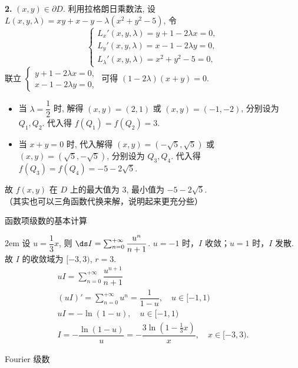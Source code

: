 \documentclass[UTF8,14pt,normal]{ctexart}
\begin{document}
    \textbf{2.} \((x, y) \in \partial D\). 利用拉格朗日乘数法, 设 \(L(x, y, \lambda) = xy + x - y - \lambda(x^2 + y^2 - 5)\), 令
    \[
        \begin{cases}
            L_x'(x, y, \lambda) = y + 1 - 2\lambda x = 0, \\
            L_y'(x, y, \lambda) = x - 1 - 2\lambda y = 0, \\
            L_\lambda'(x, y, \lambda) = x^2 + y^2 - 5 = 0,
        \end{cases}
    \]
    联立 \(\begin{cases}
        y + 1 - 2\lambda x = 0, \\
        x - 1 - 2\lambda y = 0,
        \end{cases}\) 可得 \((1 - 2\lambda)(x + y) = 0\).
    \begin{itemize}
        \item 当 \(\lambda = \dfrac{1}{2}\) 时, 解得 \((x, y) = (2, 1)\) 或 \((x, y) = (-1, -2)\), 分别设为 \(Q_1, Q_2\). 代入得 \(f(Q_1) = f(Q_2) = 3\).
        \item 当 \(x + y = 0\) 时, 代入解得 \((x, y) = (-\sqrt{5}, \sqrt{5})\) 或 \((x, y) = (\sqrt{5}, -\sqrt{5})\), 分别设为 \(Q_3, Q_4\). 代入得 \(f(Q_3) = f(Q_4) = -5 - 2\sqrt{5}\).
    \end{itemize}
    故 \(f(x, y)\) 在 \(D\) 上的最大值为 \(3\), 最小值为 \(-5 - 2\sqrt{5}\). \\
    （其实也可以三角函数代换来解，说明起来更充分些）

 函数项级数的基本计算

    \hangindent 2em
    \noindent
    设 \(u = \dfrac{1}{3} x\), 则 \(\ds I = \sum_{n = 0}^{+\infty} \dfrac{u^{n}}{n + 1}\). \(u = -1\) 时，\(I\) 收敛；\(u = 1\) 时，\(I\) 发散. 故 \(I\) 的收敛域为 \([-3, 3)\), \(r = 3\). \\
    \begin{gather*}
        uI = \sum_{n = 0}^{+\infty} \dfrac{u^{n + 1}}{n + 1} \\
        (uI)' = \sum_{n = 0}^{+\infty} u^{n} = \dfrac{1}{1 - u}, \quad u \in [-1, 1) \\
        uI = -\ln (1 - u), \quad u \in [-1, 1) \\
        I = -\dfrac{\ln (1 - u)}{u} = -\dfrac{3\ln (1 - \frac{1}{3} x)}{x}, \quad x \in [-3, 3).
    \end{gather*}

 Fourier 级数
\end{document}
